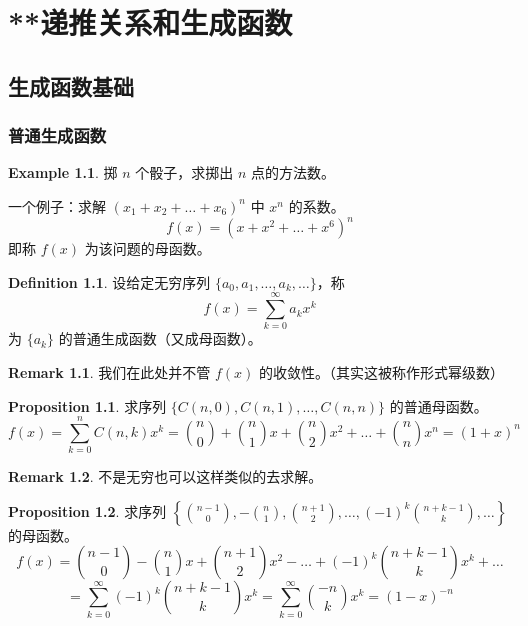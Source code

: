 \documentclass[oneside]{book}
\theoremstyle{definition}
\newtheorem{example}{Example}[section]
\newtheorem{proposition}{Proposition}[section]
\newtheorem{definition}{Definition}[section]
\newtheorem{remark}{Remark}[section]
\begin{document}
\chapter{**递推关系和生成函数}
\section{生成函数基础}
\subsection{普通生成函数}
\begin{example}
	掷 \( n \) 个骰子，求掷出 \( n \) 点的方法数。
	\bigskip
	
	一个例子：求解 \((x_1 + x_2 + \dots + x_6)^n\) 中 \( x^n \) 的系数。
	\[
	f(x) = (x + x^2 + \dots + x^6)^n
	\]
	即称 \( f(x) \) 为该问题的母函数。
\end{example}

\begin{definition}
	设给定无穷序列 \(\{a_0, a_1, \dots, a_k, \dots\}\)，称
	\[
	f(x) = \sum_{k=0}^{\infty} a_k x^k
	\]
	为 \(\{a_k\}\) 的普通生成函数（又成母函数）。
\end{definition}

\begin{remark}
	我们在此处并不管 \( f(x) \) 的收敛性。（其实这被称作形式幂级数）
\end{remark}

\begin{proposition}
	求序列 \(\{C(n,0), C(n,1), \dots, C(n,n)\}\) 的普通母函数。
	\[
	f(x) = \sum_{k=0}^{n} C(n,k) x^k = \binom{n}{0} + \binom{n}{1}x + \binom{n}{2}x^2 + \dots + \binom{n}{n}x^n = (1 + x)^n
	\]
\end{proposition}
\begin{remark}
	不是无穷也可以这样类似的去求解。
\end{remark}
\begin{proposition}
	求序列 \(\left\{ \binom{n-1}{0}, -\binom{n}{1}, \binom{n+1}{2}, \dots, (-1)^k \binom{n + k - 1}{k}, \dots \right\}\) 的母函数。
	\[
	f(x) = \binom{n-1}{0} - \binom{n}{1}x + \binom{n + 1}{2}x^2 - \dots + (-1)^k \binom{n + k - 1}{k}x^k + \dots
	\]
	\[
	= \sum_{k=0}^{\infty} (-1)^k \binom{n + k - 1}{k}x^k = \sum_{k=0}^{\infty} \binom{-n}{k}x^k = (1 - x)^{-n}
	\]
\end{proposition}
\end{document}
